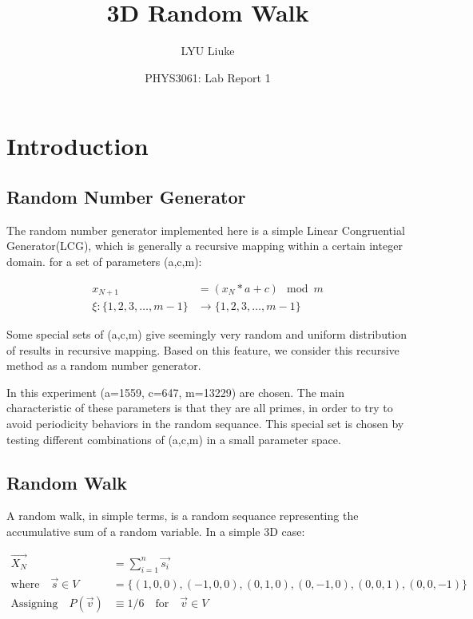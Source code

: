 \documentclass{article}
\title{3D Random Walk}
\author{LYU Liuke}
\date{PHYS3061: Lab Report 1}
\begin{document}
\maketitle
\tableofcontents
\clearpage

\section{Introduction}

\subsection{Random Number Generator}

The random number generator implemented here is a simple Linear Congruential
Generator(LCG), which is generally a recursive mapping within a certain integer
domain. for a set of parameters (a,c,m):

\begin{align*}
  x_{N+1} &= (x_N * a + c) \mod m \\
  \xi \colon \{1,2,3,\dots,m-1\} &\to \{1,2,3,\dots,m-1\}
\end{align*}

Some special sets of (a,c,m) give seemingly very random and uniform distribution
of results in recursive mapping. Based on this feature, we consider this recursive 
method as a random number generator. 

In this experiment (a=1559, c=647, m=13229) are chosen. 
The main characteristic of these parameters is that they are all primes, in order
to try to avoid periodicity behaviors in the random sequance.
This special set is chosen by testing different combinations of (a,c,m) in a
small parameter space.

\subsection{Random Walk}
  
A random walk, in simple terms, is a random sequance representing the 
accumulative sum of a random variable. In a simple 3D case:

\begin{align*}
  \vec{X_N} &= \sum_{i=1}^{n} \vec{s_i} \\
  \mbox{where} \quad  \vec{s} \in V &= \{(1,0,0), (-1,0,0), (0,1,0), (0,-1,0), (0,0,1),(0,0,-1)\} \\
  \mbox{Assigning} \quad P(\vec{v}) &\equiv 1/6 \quad \mbox{for}  \quad \vec{v} \in V
\end{align*}
\end{document}
